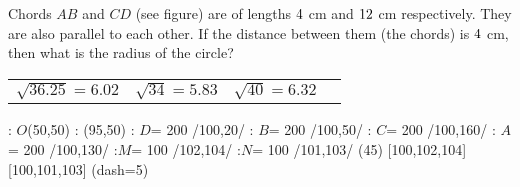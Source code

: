 

\DIVIDE{}\vp
\DIVIDE{}\vq
\SQUARE\vp\vj
\SQUARE\vq\vk
\SUBTRACT\vk\vj\vl

\EXPR[2]
\SQUARE\vz\vx
\ADD\vx\vk\vw
\SQUAREROOT\vw\vv
\ROUND[2]\vv\vu

\question[3] Chords $AB$ and $CD$ (see figure) are of lengths $4$ cm and $12$ cm respectively. They are also 
parallel to each other. If the distance between them (the chords) is $4$ cm, then what is 
the radius of the circle? 

\watchout

\begin{calcaid}
  \begin{tabular}{c c c c}
    $\sqrt{36.25}=6.02$ & $\sqrt{34}=5.83$ & $\sqrt{40}=6.32$
  \end{tabular}
\end{calcaid}

  \large
  : $O$(50,50)
  : (95,50) %
  : $D$= 200 /100,20/
  : $B$= 200 /100,50/
  : $C$= 200 /100,160/
  : $A$= 200 /100,130/
  :$M$= 100 /102,104/
  :$N$= 100 /101,103/
\figdrawbegin{}
  (45)
  \figdrawline [101,103]
  \figdrawline [102,104]
   [100,102,104]
   [100,101,103]
  \ifprintanswers
    \figset (dash=5)
    \figdrawline [100,101]
    \figdrawline [100,102]
  \fi
\figdrawend
{}

\vspace{1cm}
\centerline{\box\figBoxA}

